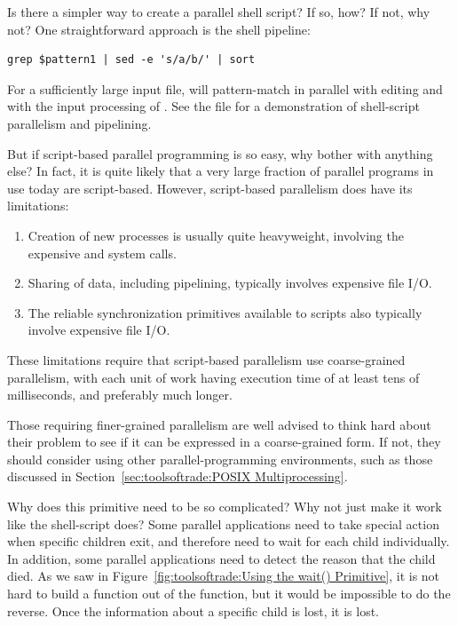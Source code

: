 \QuickQ{}
	Is there a simpler way to create a parallel shell script?
	If so, how?  If not, why not?
\QuickA{}
	One straightforward approach is the shell pipeline:
\vspace{5pt}
\begin{minipage}[t]{\columnwidth}
\small
\begin{verbatim}
grep $pattern1 | sed -e 's/a/b/' | sort
\end{verbatim}
\end{minipage}
\vspace{5pt}
	For a sufficiently large input file,
	 will pattern-match in parallel with 
	editing and with the input processing of .
	See the file  for a demonstration of
	shell-script parallelism and pipelining.

\QuickQ{}
	But if script-based parallel programming is so easy, why
	bother with anything else?
\QuickA{}
	In fact, it is quite likely that a very large fraction of
	parallel programs in use today are script-based.
	However, script-based parallelism does have its limitations:
	\begin{enumerate}
	\item	Creation of new processes is usually quite heavyweight,
		involving the expensive  and 
		system calls.
	\item	Sharing of data, including pipelining, typically involves
		expensive file I/O.
	\item	The reliable synchronization primitives available to
		scripts also typically involve expensive file I/O.
	\end{enumerate}
	These limitations require that script-based parallelism use
	coarse-grained parallelism, with each unit of work having
	execution time of at least tens of milliseconds, and preferably
	much longer.

	Those requiring finer-grained parallelism are well advised to
	think hard about their problem to see if it can be expressed
	in a coarse-grained form.
	If not, they should consider using other parallel-programming
	environments, such as those discussed in
	Section~\ref{sec:toolsoftrade:POSIX Multiprocessing}.

\QuickQ{}
	Why does this  primitive need to be so complicated?
	Why not just make it work like the shell-script  does?
\QuickA{}
	Some parallel applications need to take special action when
	specific children exit, and therefore need to wait for each
	child individually.
	In addition, some parallel applications need to detect the
	reason that the child died.
	As we saw in Figure~\ref{fig:toolsoftrade:Using the wait() Primitive},
	it is not hard to build a  function out of
	the  function, but it would be impossible to
	do the reverse.
	Once the information about a specific child is lost, it is lost.

